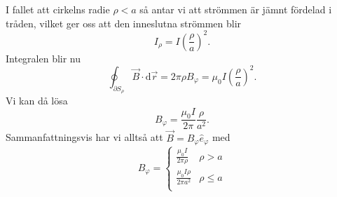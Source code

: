 \documentclass[%
oneside,                 %
final,                   %
10pt]{article}
\newenvironment{notice_mdfboxadmon}[1][]{
\begin{notice_mdfboxmdframed}[frametitle=#1]
}
{
\end{notice_mdfboxmdframed}
}
\begin{document}
\begin{notice_mdfboxadmon}
I fallet att cirkelns radie $\rho < a$ så antar vi att strömmen är 
jämnt fördelad i tråden, vilket ger oss att den inneslutna strömmen
blir
\begin{equation}
  I_\rho = I \left(\frac{\rho}{a}\right)^2.
\end{equation}
Integralen blir nu
\begin{equation}
  \oint_{\partial S_\rho} \vec{B} \cdot \mbox{d}\vec{r} = 2\pi \rho B_\varphi = \mu_0 I 
\left(\frac{\rho}{a}\right)^2.
\end{equation}
Vi kan då lösa 
\begin{equation}
  B_\varphi = \frac{\mu_0 I}{2\pi} \frac{\rho}{a^2}.
\end{equation}
Sammanfattningsvis har vi alltså att $\vec{B} = B_\varphi \hat{e}_\varphi$ med
\begin{equation}
  B_\varphi = \left\{\begin{array}{lr}
\frac{\mu_0 I}{2\pi \rho} & \rho > a\\
\frac{\mu_0 I\rho}{2\pi a^2} & \rho \le a\\
\end{array}\right.
\end{equation}
\end{notice_mdfboxadmon} %
\end{document}
